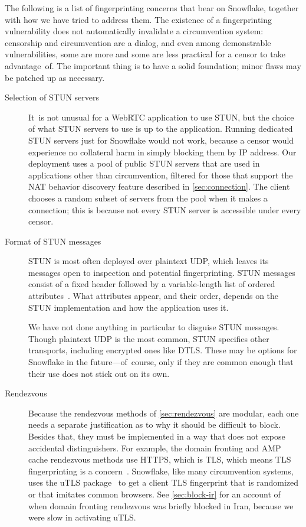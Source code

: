 \documentclass[letterpaper,twocolumn]{article}
\begin{document}
The following is a list of fingerprinting concerns
that bear on Snowflake, together with
how we have tried to address them.
The existence of a fingerprinting vulnerability
does not automatically invalidate a circumvention system:
censorship and circumvention are a dialog,
and even among demonstrable vulnerabilities,
some are more and some are less practical for a censor to take advantage~of.
The important thing is to have a solid foundation;
minor flaws may be patched up as necessary.

\begin{description}
\item[Selection of STUN servers]
It~is not unusual for a WebRTC application to use STUN,
but the choice of what STUN servers to use is up to the application.
Running dedicated STUN servers just for Snowflake would not work,
because a censor would experience no collateral harm in
simply blocking them by IP address.
Our deployment uses a pool of public STUN servers
that are used in applications other than circumvention,
filtered for those that support the NAT behavior discovery feature
described in \autoref{sec:connection}.
The client chooses a random subset of servers from the pool
when it makes a connection;
this is because not every STUN server is accessible
under every censor.

\item[Format of STUN messages]
STUN is most often deployed over plaintext UDP,
which leaves its messages open to inspection
and potential fingerprinting.
STUN messages consist of a fixed header
followed by a variable-length list of ordered
attributes~\cite[\S 5]{rfc8489}.
What attributes appear,
and their order,
depends on the STUN implementation
and how the application uses it.

We have not done anything in particular
to disguise STUN messages.
Though plaintext UDP is the most common,
STUN specifies other transports,
including encrypted ones like DTLS.
These may be options for Snowflake in the future---of~course,
only if they are common enough that their use
does not stick out on its own.

\item[Rendezvous]
Because the rendezvous methods of
\autoref{sec:rendezvous}
are modular,
each one needs a separate justification
as to why it should be difficult to block.
Besides that, they must be implemented in a way
that does not expose accidental distinguishers.
For example, the domain fronting and AMP cache rendezvous methods
use HTTPS, which is TLS,
which means TLS fingerprinting is a concern~\cite[\S 5.1]{Fifield2015a}.
Snowflake, like many circumvention systems,
uses the uTLS package~\cite[\S VII]{Frolov2019a}
to get a client TLS fingerprint that is randomized or that imitates common browsers.
See \autoref{sec:block-ir} for an account of when
domain fronting rendezvous was briefly blocked in Iran,
because we were slow in activating uTLS.


\end{description}
\end{document}
